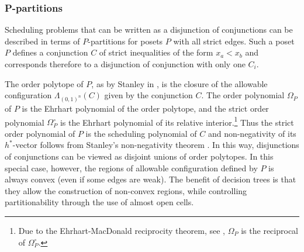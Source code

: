 \documentclass[12pt,reqno]{amsart}
\numberwithin{definition}{section}
\theoremstyle{definition}
\newcommand{\allow}{\Lambda} %
\newcommand{\allowC}{\allow_{(0,1)^n}} %
\begin{document}


\subsubsection{P-partitions} 

Scheduling problems that can be written as a disjunction of conjunctions  can be
described in terms of $P$-partitions for posets $P$ with all strict
edges.  Such a poset $P$ defines a conjunction $C$ of strict inequalities of the form $x_a<x_b$ and corresponds therefore to a disjunction of conjunction with only one $C_i$.

The order polytope of $P$, as by Stanley in \cite{StanleyOrderPolytopes}, is the closure of the allowable configuration $\allowC(C)$ given by the conjunction $C$. The order polynomial $\Omega_P$ of $P$ is the Ehrhart polynomial of the order polytope, and the strict order polynomial $\Omega^\circ_P$ is the Ehrhart polynomial of its relative interior.\footnote{Due to the Ehrhart-MacDonald reciprocity theorem, see \cite[Chapter~4]{Beck2007}, $\Omega_P$ is the reciprocal of $\Omega^\circ_P$.}  Thus the strict order polynomial of $P$ is the scheduling polynomial of $C$ and non-negativity of its $h^*$-vector follows from Stanley's non-negativity theorem \cite{StanleyDecomp}. In this way, disjunctions of conjunctions can be viewed as disjoint unions of order polytopes. In this special case, however, the regions of allowable configuration defined by $P$ is always convex (even if some edges are weak). The benefit of decision trees is that they allow the construction of non-convex regions, while controlling partitionability through the use of almost open cells.
\end{document}
